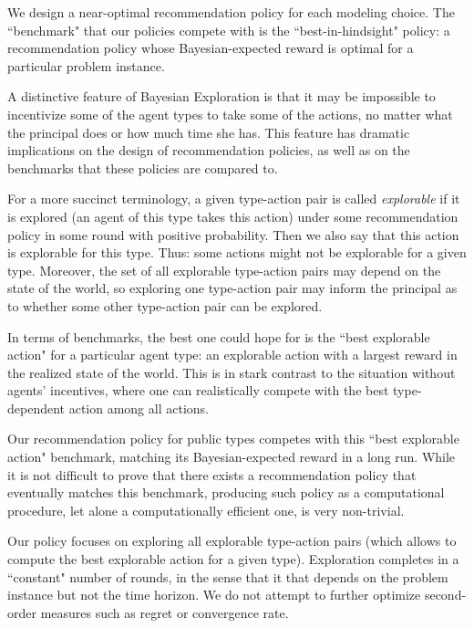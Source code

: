 We design a near-optimal recommendation policy for each modeling choice. The ``benchmark" that our policies compete with is the ``best-in-hindsight"
policy: a recommendation policy whose Bayesian-expected reward is optimal for a particular problem instance.  


A distinctive feature of Bayesian Exploration is that it may be impossible to incentivize some of the agent types to take some of the actions, no matter what the principal does or how much time she has. This feature has dramatic implications on the design of recommendation policies, as well as on the benchmarks that these policies are compared to.

For a more succinct terminology, a given type-action pair is called \emph{explorable} if it is explored (\ie an agent of this type takes this action) under some recommendation policy in some round with positive probability. Then we also say that this action is explorable for this type. Thus: some actions might not be explorable for a given type. Moreover, the set of all explorable type-action pairs may depend on the state of the world, so  exploring one type-action pair may inform the principal as to whether some other type-action pair can be explored.

In terms of benchmarks, the best one could hope for is the ``best explorable action" for a particular agent type: an explorable action with a largest reward in the realized state of the world. This is in stark contrast to the situation without agents' incentives, where one can realistically compete with the best type-dependent action among all actions.

Our recommendation policy for public types competes with this ``best explorable action" benchmark, matching its Bayesian-expected reward in a long run. While it is not difficult to prove that there exists a recommendation policy that eventually matches this benchmark, producing such policy as a computational procedure, let alone a computationally efficient one, is very non-trivial.

Our policy focuses on exploring all explorable type-action pairs (which allows to compute the best explorable action for a given type). Exploration completes in a ``constant" number of rounds, in the sense that it that depends on the problem instance but not the time horizon. We do not attempt to further optimize second-order measures such as regret or convergence rate.

